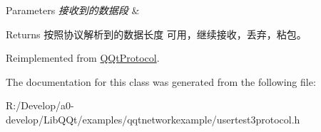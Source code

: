 \begin{DoxyParams}{Parameters}
{\em 接收到的数据段} & \\
\hline
\end{DoxyParams}
\begin{DoxyReturn}{Returns}
按照协议解析到的数据长度 可用，继续接收，丢弃，粘包。 
\end{DoxyReturn}


Reimplemented from \mbox{\hyperlink{class_q_qt_protocol_a00fd0c1ac23379ed3b9b25da9a34f39b}{Q\+Qt\+Protocol}}.



The documentation for this class was generated from the following file\+:\begin{DoxyCompactItemize}
\item 
R\+:/\+Develop/a0-\/develop/\+Lib\+Q\+Qt/examples/qqtnetworkexample/usertest3protocol.\+h\end{DoxyCompactItemize}

